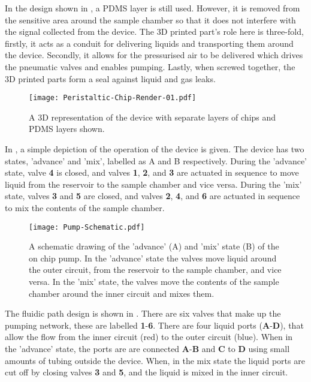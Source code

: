 In the design shown in , a PDMS layer is still used. However, it is removed from the
sensitive area around the sample chamber so that it does not interfere with the signal
collected from the device. The 3D printed part's role here is three-fold, firstly, it acts
as a conduit for delivering liquids and transporting them around the device. Secondly, it
allows for the pressurised air to be delivered which drives the pneumatic valves and
enables pumping. Lastly, when screwed together, the 3D printed parts form a seal against
liquid and gas leaks.

\begin{figure}[ht]
  \begin{center}
  \texttt{[image: Peristaltic-Chip-Render-01.pdf]}
  \caption{A 3D representation of the device with separate layers of chips and PDMS
  layers shown.}
  \label{fig:3Ddevice}
  \end{center}
\end{figure}

In , a simple depiction of the operation of the device is given. The
device has two states, 'advance' and 'mix', labelled as A and B respectively. During the 'advance'
state, valve \textbf{4} is closed, and valves \textbf{1}, \textbf{2}, and \textbf{3} are actuated in sequence to move liquid from
the reservoir to the sample chamber and vice versa. During the 'mix' state, valves \textbf{3}
and \textbf{5} are closed, and valves \textbf{2}, \textbf{4}, and \textbf{6} are actuated in sequence
to mix the contents of the sample chamber.

\begin{figure}[ht]
  \begin{center}
  \texttt{[image: Pump-Schematic.pdf]}
  \caption{A schematic drawing of the 'advance' (A) and 'mix' state (B) of the on chip pump. In the 'advance'
  state the valves move liquid around the outer circuit, from the reservoir to the sample chamber, and vice versa.
  In the 'mix' state, the valves move the contents of the sample chamber around the inner circuit and mixes them.}
  \label{fig:OperationSchematic}
  \end{center}
\end{figure}


The fluidic path design is shown in . There are six valves that make up the pumping network,
these are labelled \textbf{1}-\textbf{6}. There are four liquid ports (\textbf{A}-\textbf{D}), that allow the
flow from the inner circuit (red) to the outer circuit (blue). When in the 'advance' state, the ports are
are connected \textbf{A}-\textbf{B} and \textbf{C} to \textbf{D} using small amounts of tubing outside the device. When,
in the mix state the liquid ports are cut off by closing valves \textbf{3} and \textbf{5}, and the liquid is mixed in the
inner circuit.

